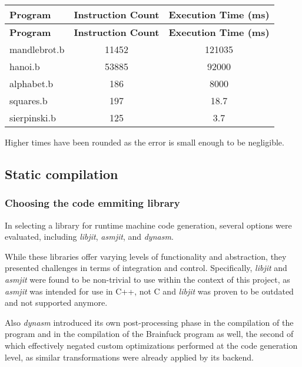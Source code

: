 \begin{longtable}{|l|c|c|}
\hline
\textbf{Program} & \textbf{Instruction Count} & \textbf{Execution Time (ms)} \\
\hline
\endfirsthead

\hline
\textbf{Program} & \textbf{Instruction Count} & \textbf{Execution Time (ms)} \\
\hline
\endhead

\hline
\endfoot

\hline
\endlastfoot

mandlebrot.b  & 11452  & 121035        \\
hanoi.b       & 53885  & 92000         \\
alphabet.b    & 186    & 8000          \\
squares.b     & 197    & 18.7          \\
sierpinski.b  & 125    & 3.7           \\
\end{longtable}

\par Higher times have been rounded as the error is small enough to be negligible.

\subsection{Static compilation}
\label{sec:ch2sec2sub2}

\subsubsection{Choosing the code emmiting library}
\label{sec:ch2sec2sub2sec1}

\par In selecting a library for runtime machine code generation, several options were evaluated, including \textit{libjit}, \textit{asmjit}, and \textit{dynasm}.

\par While these libraries offer varying levels of functionality and abstraction, they presented challenges in terms of integration and control. Specifically, \textit{libjit} and \textit{asmjit} were found to be non-trivial to use within the context of this project, as \textit{asmjit} was intended for use in C++, not C and \textit{libjit} was proven to be outdated and not supported anymore.

\par Also \textit{dynasm} introduced its own post-processing phase in the compilation of the program and in the compilation of the Brainfuck program as well, the second of which effectively negated custom optimizations performed at the code generation level, as similar transformations were already applied by its backend.


